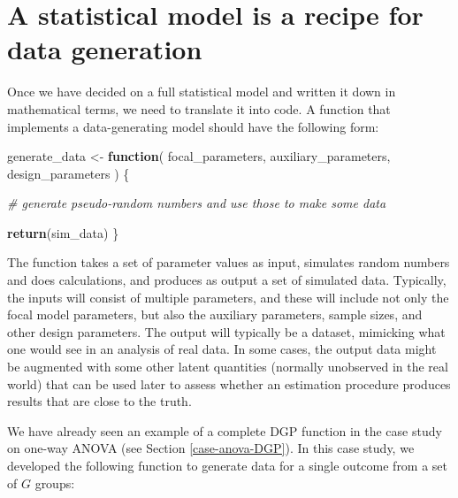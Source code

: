 \documentclass[
]{book}
\newenvironment{Shaded}{\begin{snugshade}}{\end{snugshade}}
\newcommand{\CommentTok}[1]{\textcolor[rgb]{0.56,0.35,0.01}{\textit{#1}}}
\newcommand{\ControlFlowTok}[1]{\textcolor[rgb]{0.13,0.29,0.53}{\textbf{#1}}}
\newcommand{\FunctionTok}[1]{\textcolor[rgb]{0.13,0.29,0.53}{\textbf{#1}}}
\newcommand{\NormalTok}[1]{#1}
\newcommand{\OtherTok}[1]{\textcolor[rgb]{0.56,0.35,0.01}{#1}}
\begin{document}
\section{A statistical model is a recipe for data generation}\label{DGP-functions}

Once we have decided on a full statistical model and written it down in mathematical terms, we need to translate it into code.
A function that implements a data-generating model should have the following form:

\begin{Shaded}
\begin{Highlighting}[]
\NormalTok{generate\_data }\OtherTok{\textless{}{-}} \ControlFlowTok{function}\NormalTok{( }
\NormalTok{  focal\_parameters, auxiliary\_parameters, design\_parameters}
\NormalTok{) \{}
  
  \CommentTok{\# generate pseudo{-}random numbers and use those to make some data}
  
  \FunctionTok{return}\NormalTok{(sim\_data)}
\NormalTok{\}}
\end{Highlighting}
\end{Shaded}

The function takes a set of parameter values as input, simulates random numbers and does calculations, and produces as output a set of simulated data.
Typically, the inputs will consist of multiple parameters, and these will include not only the focal model parameters, but also the auxiliary parameters, sample sizes, and other design parameters.
The output will typically be a dataset, mimicking what one would see in an analysis of real data.
In some cases, the output data might be augmented with some other latent quantities (normally unobserved in the real world) that can be used later to assess whether an estimation procedure produces results that are close to the truth.

We have already seen an example of a complete DGP function in the case study on one-way ANOVA (see Section \ref{case-anova-DGP}).
In this case study, we developed the following function to generate data for a single outcome from a set of \(G\) groups:
\end{document}
